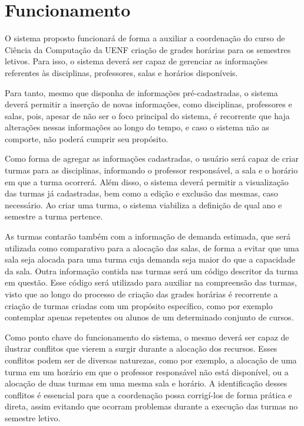 \section{Funcionamento} %

O sistema proposto funcionará de forma a auxiliar a coordenação do curso de Ciência da Computação da UENF criação de grades horárias para os semestres letivos. Para isso, o sistema deverá ser capaz de gerenciar as informações referentes às disciplinas, professores, salas e horários disponíveis.

Para tanto, mesmo que disponha de informações pré-cadastradas, o sistema deverá permitir a inserção de novas informações, como disciplinas, professores e salas, pois, apesar de não ser o foco principal do sistema, é recorrente que haja alterações nessas informações ao longo do tempo, e caso o sistema não as comporte, não poderá cumprir seu propósito.

Como forma de agregar as informações cadastradas, o usuário será capaz de criar turmas para as disciplinas, informando o professor responsável, a sala e o horário em que a turma ocorrerá. Além disso, o sistema deverá permitir a visualização das turmas já cadastradas, bem como a edição e exclusão das mesmas, caso necessário. Ao criar uma turma, o sistema viabiliza a definição de qual ano e semestre a turma pertence.

As turmas contarão também com a informação de demanda estimada, que será utilizada como comparativo para a alocação das salas, de forma a evitar que uma sala seja alocada para uma turma cuja demanda seja maior do que a capacidade da sala. Outra informação contida nas turmas será um código descritor da turma em questão. Esse código será utilizado para auxiliar na compreensão das turmas, visto que ao longo do processo de criação das grades horárias é recorrente a criação de turmas criadas com um propósito específico, como por exemplo contemplar apenas repetentes ou alunos de um determinado conjunto de cursos.

Como ponto chave do funcionamento do sistema, o mesmo deverá ser capaz de ilustrar conflitos que vierem a surgir durante a alocação dos recursos. Esses conflitos podem ser de diversas naturezas, como por exemplo, a alocação de uma turma em um horário em que o professor responsável não está disponível, ou a alocação de duas turmas em uma mesma sala e horário. A identificação desses conflitos é essencial para que a coordenação possa corrigí-los de forma prática e direta, assim evitando que ocorram problemas durante a execução das turmas no semestre letivo.

